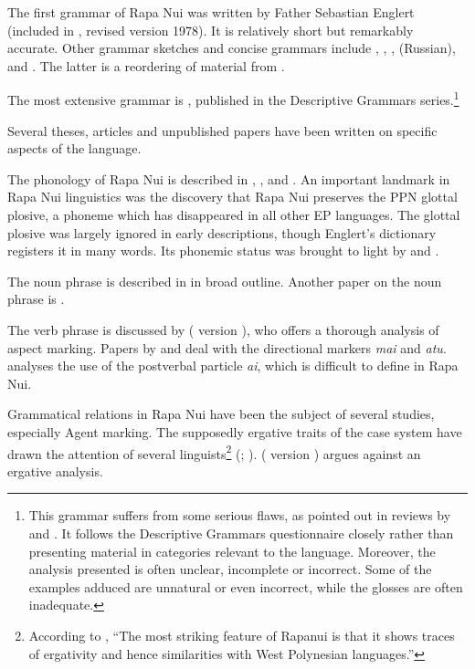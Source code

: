 The first grammar of Rapa Nui was written by Father Sebastian Englert (included in \citealt{Englert1948}, revised version 1978). It is relatively short but remarkably accurate. Other grammar sketches and concise grammars include \citet{Fuentes1960}, \citet{Chapin1978}, \citet{Munro1978}, \citet{Fedorova1988} (Russian), \citet{ConteOliveros1996} and \citet{Rubino1998}. The latter is a reordering of material from \citet{DuFeu1996}.

The most extensive grammar is \citet{DuFeu1996}, published in the Descriptive Grammars series.\footnote{\label{fn:25}This grammar suffers from some serious flaws, as pointed out in reviews by \citet{Mosel1997} and \citet{WeberWeber1999}. It follows the Descriptive Grammars questionnaire closely rather than presenting material in categories relevant to the language. Moreover, the analysis presented is often unclear, incomplete or incorrect. Some of the examples adduced are unnatural or even incorrect, while the glosses are often inadequate.} 

Several theses, articles and unpublished papers have been written on specific aspects of the language. 

The phonology of Rapa Nui is described in \citet{DuFeu1985}, \citet{GuerraEissmann1993}, \citet{Salas1973} and \citet{WeberWeber1982}. An important landmark in Rapa Nui linguistics was the discovery that Rapa Nui preserves the PPN glottal plosive, a phoneme which has disappeared in all other EP languages. The glottal plosive was largely ignored in early descriptions, though Englert’s dictionary registers it in many words. Its phonemic status was brought to light by \citet{Ward1961,Ward1964} and \citet{Blixen1972}. 

The noun phrase is described in \citet{DuFeu1987} in broad outline. Another paper on the noun phrase is \citet{Gordon1977}.

The verb phrase is discussed by \citet{WeberR1988} ( version \citealt{WeberR2003}), who offers a thorough analysis of aspect marking. Papers by \citet{Fuller1980} and \citet{Wittenstein1978} deal with the directional markers \textit{mai} and \textit{atu}. \citet{Chapin1974} analyses the use of the postverbal particle \textit{ai}, which is difficult to define in Rapa Nui. 

Grammatical relations in Rapa Nui have been the subject of several studies, especially Agent marking. The supposedly ergative traits of the case system have drawn the attention of several linguists\footnote{\label{fn:26}According to \citet[182]{Mosel1997}, “The most striking feature of Rapanui is that it shows traces of ergativity and hence similarities with West Polynesian languages.”} (\citealt{Alexander1981OL,Alexander1981Minnesota,Alexander1982,FinneyAlexander1998}; \citealt{Finney2000,Finney2001}). \citet{WeberR1988} ( version \citealt{WeberR2003}) argues against an ergative analysis.

